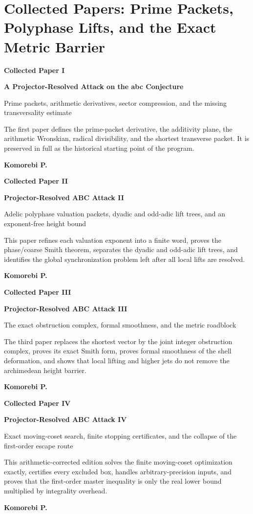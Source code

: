 \documentclass[11pt,openany]{book}
\theoremstyle{definition}
\theoremstyle{remark}
\newcommand{\PaperDivider}[4]{%
\clearpage
\thispagestyle{empty}
\vspace*{0.85in}
{\color{Blue}\Large\bfseries #1\par}
\vspace{0.16in}
{\Huge\bfseries #2\par}
\vspace{0.16in}
{\Large\color{Muted} #3\par}
\vspace{0.40in}
\begin{minipage}{0.88\textwidth}
\large #4
\end{minipage}
\vfill
{\large\bfseries Komorebi P.\par}
\clearpage}
\begin{document}


\part{Collected Papers: Prime Packets, Polyphase Lifts, and the Exact Metric Barrier}
\PaperDivider{Collected Paper I}{A Projector-Resolved Attack on the abc Conjecture}{Prime packets, arithmetic derivatives, sector compression, and the missing transversality estimate}{The first paper defines the prime-packet derivative, the additivity plane, the arithmetic Wronskian, radical divisibility, and the shortest transverse packet. It is preserved in full as the historical starting point of the program.}


\PaperDivider{Collected Paper II}{Projector-Resolved ABC Attack II}{Adelic polyphase valuation packets, dyadic and odd-adic lift trees, and an exponent-free height bound}{This paper refines each valuation exponent into a finite word, proves the phase/coarse Smith theorem, separates the dyadic and odd-adic lift trees, and identifies the global synchronization problem left after all local lifts are resolved.}


\PaperDivider{Collected Paper III}{Projector-Resolved ABC Attack III}{The exact obstruction complex, formal smoothness, and the metric roadblock}{The third paper replaces the shortest vector by the joint integer obstruction complex, proves its exact Smith form, proves formal smoothness of the shell deformation, and shows that local lifting and higher jets do not remove the archimedean height barrier.}


\PaperDivider{Collected Paper IV}{Projector-Resolved ABC Attack IV}{Exact moving-coset search, finite stopping certificates, and the collapse of the first-order escape route}{This arithmetic-corrected edition solves the finite moving-coset optimization exactly, certifies every excluded box, handles arbitrary-precision inputs, and proves that the first-order master inequality is only the real lower bound multiplied by integrality overhead.}

\end{document}
